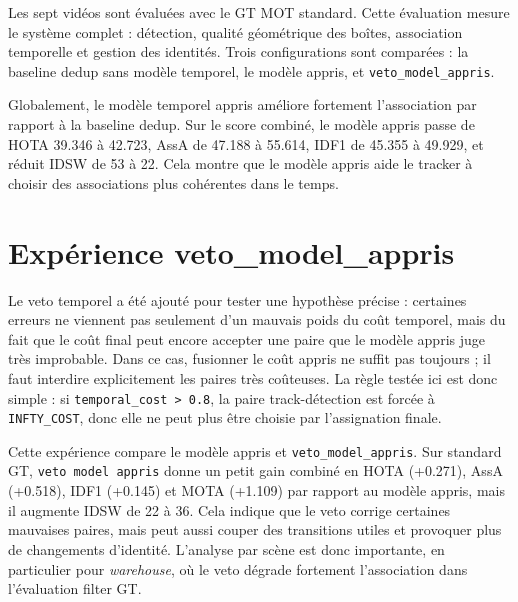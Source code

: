 \documentclass[11pt,a4paper]{article}
\begin{document}
Les sept vidéos sont évaluées avec le GT MOT standard. Cette évaluation mesure le système complet : détection, qualité géométrique des boîtes, association temporelle et gestion des identités. Trois configurations sont comparées : la baseline dedup sans modèle temporel, le modèle appris, et \texttt{veto\_model\_appris}.

Globalement, le modèle temporel appris améliore fortement l'association par rapport à la baseline dedup. Sur le score combiné, le modèle appris passe de HOTA 39.346 à 42.723, AssA de 47.188 à 55.614, IDF1 de 45.355 à 49.929, et réduit IDSW de 53 à 22. Cela montre que le modèle appris aide le tracker à choisir des associations plus cohérentes dans le temps.




\section{Expérience veto\_model\_appris}

Le veto temporel a été ajouté pour tester une hypothèse précise : certaines erreurs ne viennent pas seulement d'un mauvais poids du coût temporel, mais du fait que le coût final peut encore accepter une paire que le modèle appris juge très improbable. Dans ce cas, fusionner le coût appris ne suffit pas toujours ; il faut interdire explicitement les paires très coûteuses. La règle testée ici est donc simple : si \texttt{temporal\_cost > 0.8}, la paire track-détection est forcée à \texttt{INFTY\_COST}, donc elle ne peut plus être choisie par l'assignation finale.

Cette expérience compare le modèle appris et \texttt{veto\_model\_appris}. Sur standard GT, \texttt{veto model appris} donne un petit gain combiné en HOTA (+0.271), AssA (+0.518), IDF1 (+0.145) et MOTA (+1.109) par rapport au modèle appris, mais il augmente IDSW de 22 à 36. Cela indique que le veto corrige certaines mauvaises paires, mais peut aussi couper des transitions utiles et provoquer plus de changements d'identité. L'analyse par scène est donc importante, en particulier pour \textit{warehouse}, où le veto dégrade fortement l'association dans l'évaluation filter GT.
\end{document}
